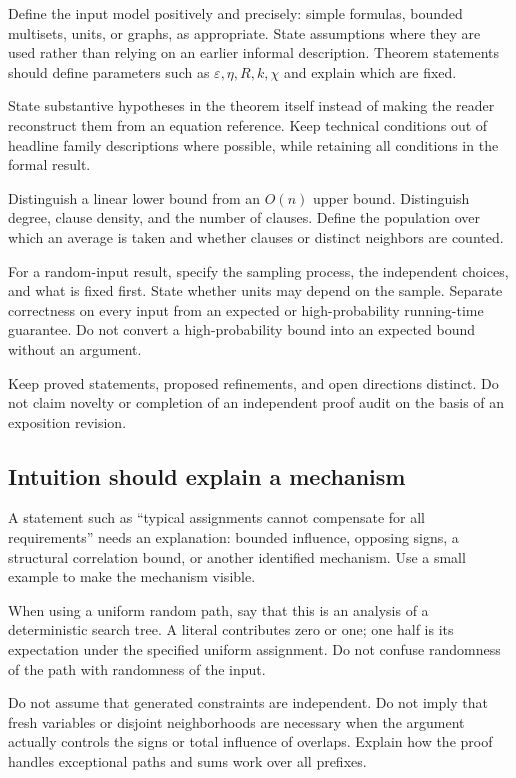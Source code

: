 \documentclass[11pt,a4paper]{article}
\begin{document}
Define the input model positively and precisely: simple formulas,
bounded multisets, units, or graphs, as appropriate. State assumptions
where they are used rather than relying on an earlier informal
description. Theorem statements should define parameters such as
$\varepsilon,\eta,R,k,\chi$ and explain which are fixed.

State substantive hypotheses in the theorem itself instead of making
the reader reconstruct them from an equation reference. Keep technical
conditions out of headline family descriptions where possible, while
retaining all conditions in the formal result.

Distinguish a linear lower bound from an $O(n)$ upper bound. Distinguish
degree, clause density, and the number of clauses. Define the population
over which an average is taken and whether clauses or distinct neighbors
are counted.

For a random-input result, specify the sampling process, the independent
choices, and what is fixed first. State whether units may depend on the
sample. Separate correctness on every input from an expected or
high-probability running-time guarantee. Do not convert a high-probability
bound into an expected bound without an argument.

Keep proved statements, proposed refinements, and open directions
distinct. Do not claim novelty or completion of an independent proof
audit on the basis of an exposition revision.

\subsection{Intuition should explain a mechanism}

A statement such as ``typical assignments cannot compensate for all
requirements'' needs an explanation: bounded influence, opposing signs,
a structural correlation bound, or another identified mechanism. Use a
small example to make the mechanism visible.

When using a uniform random path, say that this is an analysis of a
deterministic search tree. A literal contributes zero or one; one half is
its expectation under the specified uniform assignment. Do not confuse
randomness of the path with randomness of the input.

Do not assume that generated constraints are independent. Do not imply
that fresh variables or disjoint neighborhoods are necessary when the
argument actually controls the signs or total influence of overlaps.
Explain how the proof handles exceptional paths and sums work over all
prefixes.
\end{document}
